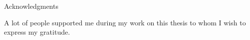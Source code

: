 
\begin{center} 


\huge Acknowledgments

\end{center}
A lot of people supported me during my work on this thesis to whom I wish to express my gratitude.

